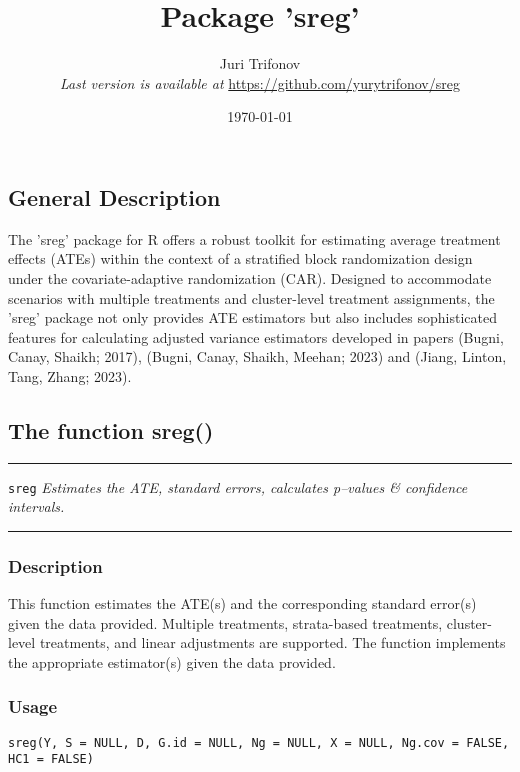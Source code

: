 \documentclass{article}
\title{\textbf{Package 'sreg'}}
\author{Juri Trifonov \\ \textit{Last version is available at} \href{https://github.com/yurytrifonov/sreg}{https://github.com/yurytrifonov/sreg}
}
\date{\today}
\newenvironment{cranfunction}[2]{%
    \textcolor{linecolor}{\rule{\linewidth}{0.4pt}}\par\vspace*{\fill}
    \texttt{#1} \hfill #2\par\nobreak\noindent
    \textcolor{linecolor}{\rule{\linewidth}{0.4pt}}\vspace*{\fill}\par
}{%

}
\begin{document}
\maketitle

\subsection*{General Description}
The 'sreg' package for R offers a robust toolkit for estimating average treatment effects (ATEs) within the context of a stratified block randomization design under the covariate-adaptive randomization (CAR). Designed to accommodate scenarios with multiple treatments and cluster-level treatment assignments, the 'sreg' package not only provides ATE estimators but also includes sophisticated features for calculating adjusted variance estimators developed in papers (Bugni, Canay, Shaikh; 2017), (Bugni, Canay, Shaikh, Meehan; 2023) and (Jiang, Linton, Tang, Zhang; 2023).

\subsection*{The function sreg()}

\begin{cranfunction}{sreg}{\textit{Estimates the ATE, standard errors, calculates p--values \& confidence intervals.}}
\end{cranfunction}
\subsubsection*{Description}
This function estimates the ATE(s) and the corresponding standard error(s) given the data provided. Multiple treatments, strata-based treatments, cluster-level treatments, and linear adjustments are supported. The function implements the appropriate estimator(s) given the data provided.
\subsubsection*{Usage}
\texttt{sreg(Y, S = NULL, D, G.id = NULL, Ng = NULL, X = NULL, Ng.cov = FALSE, HC1 = FALSE)}
\end{document}
